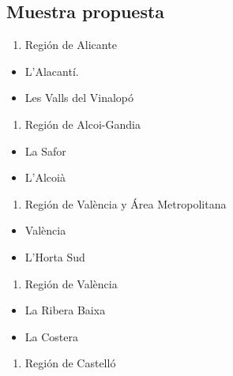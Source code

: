 \documentclass[
]{article}
\providecommand{\tightlist}{%
  \setlength{\itemsep}{0pt}\setlength{\parskip}{0pt}}
\begin{document}
\hypertarget{muestra-propuesta}{%
\subsection{Muestra propuesta}\label{muestra-propuesta}}

\begin{enumerate}
\def\labelenumi{\arabic{enumi}.}
\tightlist
\item
  Región de Alicante
\end{enumerate}

\begin{itemize}
\tightlist
\item
  L'Alacantí.
\item
  Les Valls del Vinalopó
\end{itemize}

\begin{enumerate}
\def\labelenumi{\arabic{enumi}.}
\setcounter{enumi}{1}
\tightlist
\item
  Región de Alcoi-Gandia
\end{enumerate}

\begin{itemize}
\tightlist
\item
  La Safor
\item
  L'Alcoià
\end{itemize}

\begin{enumerate}
\def\labelenumi{\arabic{enumi}.}
\setcounter{enumi}{2}
\tightlist
\item
  Región de València y Área Metropolitana
\end{enumerate}

\begin{itemize}
\tightlist
\item
  València
\item
  L'Horta Sud
\end{itemize}

\begin{enumerate}
\def\labelenumi{\arabic{enumi}.}
\setcounter{enumi}{3}
\tightlist
\item
  Región de València
\end{enumerate}

\begin{itemize}
\tightlist
\item
  La Ribera Baixa
\item
  La Costera
\end{itemize}

\begin{enumerate}
\def\labelenumi{\arabic{enumi}.}
\setcounter{enumi}{4}
\tightlist
\item
  Región de Castelló
\end{enumerate}
\end{document}
